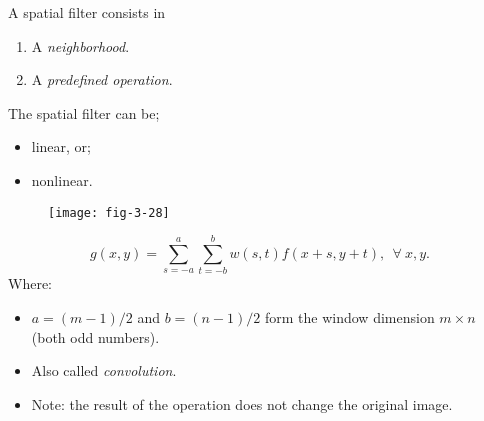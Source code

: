 
\begin{frame}
A spatial filter consists in
\begin{enumerate}
\item A \textit{neighborhood}.
\item A \textit{predefined operation}.
\end{enumerate}
The spatial filter can be;
\begin{itemize}
\item linear, or;
\item nonlinear.
\end{itemize}
\end{frame}


\begin{frame}
\begin{figure}
\centering
\texttt{[image: fig-3-28]}
\end{figure}
\end{frame}


\begin{frame}
\begin{equation}
g(x,y) = \sum_{s=-a}^{a}\sum_{t=-b}^{b} w(s,t) f(x+s, y+t),\ \ \forall\  x,y.
\end{equation}
Where:
\begin{itemize}
\item $a = (m-1)/2$ and $b=(n-1)/2$ form the window dimension $m\times n$ (both odd numbers).
\item Also called \textit{convolution}.
\item Note: the result of the operation does not change the original image.
\end{itemize}
\end{frame}


